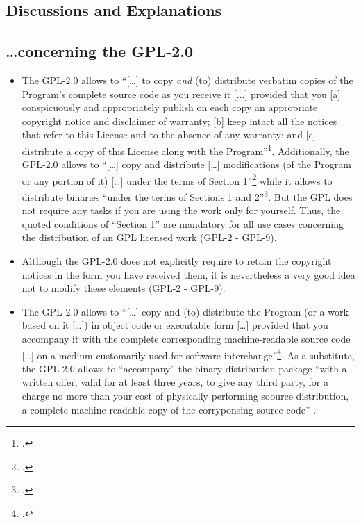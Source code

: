 \subsection{Discussions and Explanations}
\subsection{\ldots concerning the GPL-2.0}

\begin{itemize}
  
  \item The GPL-2.0 allows to \enquote{[\ldots] to copy \emph{and} (to)
  distribute verbatim copies of the Program's complete source code as you
  receive it [...] provided that you [a] conspicuously and appropriately publish
  on each copy an appropriate copyright notice and disclaimer of warranty; [b]
  keep intact all the notices that refer to this License and to the absence of
  any warranty; and [c] distribute a copy of this License along with the
  Program}\footcite[cf.][\nopage wp.\ §1, emphasizes by
  KR]{Gpl20OsiLicense1991a}. Additionally, the GPL-2.0 allows to
  \enquote{[\ldots] copy and distribute [\ldots] modifications (of the Program
  or any portion of it) [\ldots] under the terms of Section
  1}\footcite[cf.][\nopage wp.\ §2]{Gpl20OsiLicense1991a} while it allows to
  distribute binaries \enquote{under the terms of Sections 1 and
  2}\footcite[cf.][\nopage wp.\ §4]{Gpl20OsiLicense1991a}. But the GPL does not
  require any tasks if you are using the work only for yourself. Thus, the
  quoted conditions of \enquote{Section 1} are mandatory for all use cases
  concerning the distribution of an GPL licensed work (GPL-2 - GPL-9).

  \item Although the GPL-2.0 does not explicitly require to retain the
  copyright notices in the form you have received them, it is nevertheless a
  very good idea not to modify these elements (GPL-2 - GPL-9).
  
  \item The GPL-2.0 allows to \enquote{[\ldots] copy and (to) distribute the
  Program (or a work based on it [\ldots]) in object code or executable form
  [\ldots] provided that you accompany it with the complete corresponding
  machine-readable source code [\ldots] on a medium customarily used for
  software interchange}\footcite[cf.][\nopage wp.\ §4,
  §4a]{Gpl20OsiLicense1991a}. As a substitute, the GPL-2.0 allows to
  \enquote{accompany} the binary distribution package \enquote{with a written
  offer, valid for at least three years, to give any third party, for a charge
  no more than your cost of physically performing soource distribution, a
  complete machine-readable copy of the corryponsing source code} .
  

\end{itemize}
